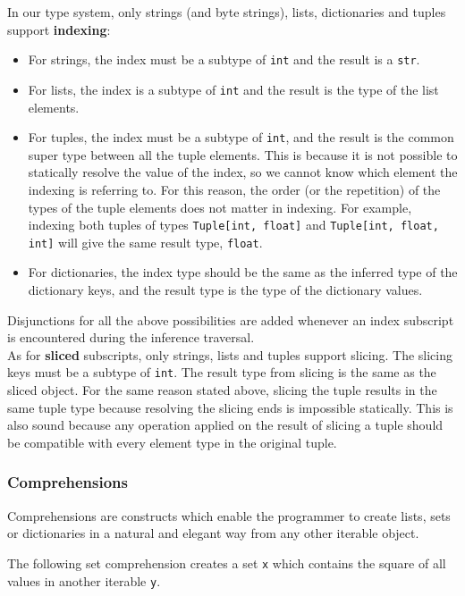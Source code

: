 In our type system, only strings (and byte strings), lists, dictionaries and tuples support \textbf{indexing}:

\begin{itemize}
	\item For strings, the index must be a subtype of \lstinline|int| and the result is a \lstinline|str|.
	\item For lists, the index is a subtype of \lstinline|int| and the result is the type of the list elements.
	\item For tuples, the index must be a subtype of \lstinline|int|, and the result is the common super type between all the tuple elements. This is because it is not possible to statically resolve the value of the index, so we cannot know which element the indexing is referring to. For this reason, the order (or the repetition) of the types of the tuple elements does not matter in indexing. For example, indexing both tuples of types \lstinline|Tuple[int, float]| and \lstinline|Tuple[int, float, int]| will give the same result type, \lstinline|float|.
	\item For dictionaries, the index type should be the same as the inferred type of the dictionary keys, and the result type is the type of the dictionary values.
\end{itemize}

Disjunctions for all the above possibilities are added whenever an index subscript is encountered during the inference traversal. \\

As for \textbf{sliced} subscripts, only strings, lists and tuples support slicing. The slicing keys must be a subtype of \lstinline|int|. The result type from slicing is the same as the sliced object. For the same reason stated above, slicing the tuple results in the same tuple type because resolving the slicing ends is impossible statically. This is also sound because any operation applied on the result of slicing a tuple should be compatible with every element type in the original tuple.

\subsubsection{Comprehensions}
Comprehensions are constructs which enable the programmer to create lists, sets or dictionaries in a natural and elegant way from any other iterable object.

The following set comprehension creates a set \lstinline|x| which contains the square of all values in another iterable \lstinline|y|.

